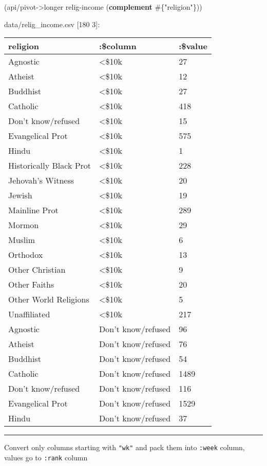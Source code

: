 \documentclass[]{article}
\newenvironment{Shaded}{\begin{snugshade}}{\end{snugshade}}
\newcommand{\KeywordTok}[1]{\textcolor[rgb]{0.13,0.29,0.53}{\textbf{#1}}}
\newcommand{\StringTok}[1]{\textcolor[rgb]{0.31,0.60,0.02}{#1}}
\newcommand{\CommentTok}[1]{\textcolor[rgb]{0.56,0.35,0.01}{\textit{#1}}}
\newcommand{\FunctionTok}[1]{\textcolor[rgb]{0.00,0.00,0.00}{#1}}
\newcommand{\VariableTok}[1]{\textcolor[rgb]{0.00,0.00,0.00}{#1}}
\newcommand{\BuiltInTok}[1]{#1}
\newcommand{\AttributeTok}[1]{\textcolor[rgb]{0.77,0.63,0.00}{#1}}
\newcommand{\NormalTok}[1]{#1}
\begin{document}
\begin{Shaded}
\begin{Highlighting}[]
\NormalTok{(api/pivot->longer relig-income (}\KeywordTok{complement}\NormalTok{ #\{}\StringTok{"religion"}\NormalTok{\}))}
\end{Highlighting}
\end{Shaded}

data/relig\_income.csv {[}180 3{]}:

\begin{longtable}[]{@{}lll@{}}
\toprule
religion & :\$column & :\$value\tabularnewline
\midrule
\endhead
Agnostic & \textless{}\$10k & 27\tabularnewline
Atheist & \textless{}\$10k & 12\tabularnewline
Buddhist & \textless{}\$10k & 27\tabularnewline
Catholic & \textless{}\$10k & 418\tabularnewline
Don't know/refused & \textless{}\$10k & 15\tabularnewline
Evangelical Prot & \textless{}\$10k & 575\tabularnewline
Hindu & \textless{}\$10k & 1\tabularnewline
Historically Black Prot & \textless{}\$10k & 228\tabularnewline
Jehovah's Witness & \textless{}\$10k & 20\tabularnewline
Jewish & \textless{}\$10k & 19\tabularnewline
Mainline Prot & \textless{}\$10k & 289\tabularnewline
Mormon & \textless{}\$10k & 29\tabularnewline
Muslim & \textless{}\$10k & 6\tabularnewline
Orthodox & \textless{}\$10k & 13\tabularnewline
Other Christian & \textless{}\$10k & 9\tabularnewline
Other Faiths & \textless{}\$10k & 20\tabularnewline
Other World Religions & \textless{}\$10k & 5\tabularnewline
Unaffiliated & \textless{}\$10k & 217\tabularnewline
Agnostic & Don't know/refused & 96\tabularnewline
Atheist & Don't know/refused & 76\tabularnewline
Buddhist & Don't know/refused & 54\tabularnewline
Catholic & Don't know/refused & 1489\tabularnewline
Don't know/refused & Don't know/refused & 116\tabularnewline
Evangelical Prot & Don't know/refused & 1529\tabularnewline
Hindu & Don't know/refused & 37\tabularnewline
\bottomrule
\end{longtable}

\begin{center}\rule{0.5\linewidth}{0.5pt}\end{center}

Convert only columns starting with \texttt{"wk"} and pack them into
\texttt{:week} column, values go to \texttt{:rank} column

\begin{Shaded}
\end{Shaded}
\end{document}
